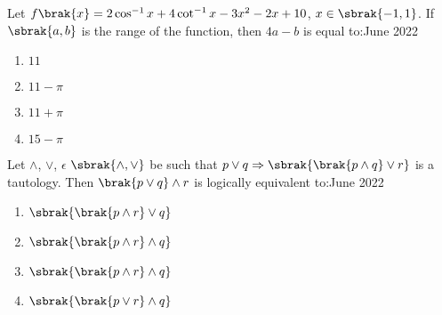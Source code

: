     \item Let $f\brak{x}=2\cos^{-1}x+4\cot^{-1}x-3x^{2}-2x+10$, $x\in\sbrak{-1,1}$. If $\sbrak{a,b}$ is the range of the function, then $4a-b$ is equal to:\hfill{June 2022}

        \begin{multicols}{4}
        \begin{enumerate}
        \item $11$
        \item $11-\pi$
        \item $11+\pi$
        \item $15-\pi$
        \end{enumerate}
        \end{multicols}

    \item Let $\land$, $\lor$, $\epsilon$ $\sbrak{\land,\lor}$ be such that $p\lor q\Rightarrow\sbrak{\brak{p\land q}\lor r}$ is a tautology. Then $\brak{p\lor q}\land r$ is logically equivalent to:\hfill{June 2022}

        \begin{multicols}{4}
        \begin{enumerate}
        \item $\sbrak{\brak{p\land r}\lor q}$
        \item $\sbrak{\brak{p\land r}\land q}$
        \item $\sbrak{\brak{p\land r}\land q}$
        \item $\sbrak{\brak{p\lor r}\land q}$
        \end{enumerate}
        \end{multicols}
